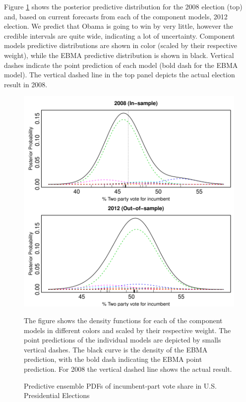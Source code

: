 \documentclass[12pt,fullpage,endnotes]{article}
\begin{document}
Figure \ref{pres} shows the posterior predictive distribution for the
2008 election (top) and, based on current forecasts from each of the
component models, 2012 election.  We predict that Obama is going to
win by very little, however the credible intervals are quite wide,
indicating a lot of uncertainty. Component models predictive
distributions are shown in color (scaled by their respective weight),
while the EBMA predictive distribution is shown in black. Vertical
dashes indicate the point prediction of each model (bold dash for the
EBMA model). The vertical dashed line in the top panel depicts the
actual election result in 2008.

\begin{figure}[h]
\caption{Predictive ensemble PDFs of incumbent-part vote share in U.S. Presidential Elections}
\label{pres}
\begin{center}
\includegraphics[scale=.8]{presForecast}
\end{center}
The figure shows the density functions for each of the component
models in different colors and scaled by their respective weight. The
point predictions of the individual models are depicted by smalls
vertical dashes. The black curve is the density of the EBMA
prediction, with the bold dash indicating the EBMA point
prediction. For 2008 the vertical dashed line shows the actual result.
\end{figure}
\end{document}
